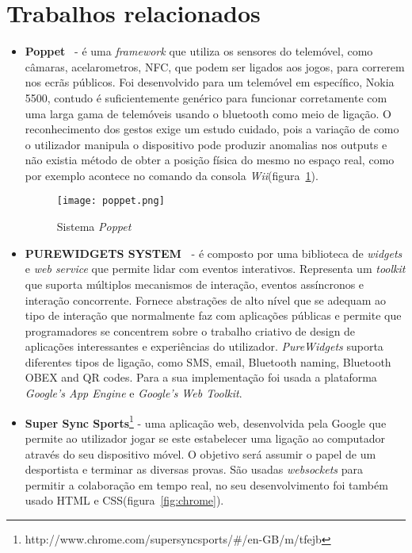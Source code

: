 \section{Trabalhos relacionados}
\begin{itemize}
\item \textbf{Poppet}~\cite{Vajk2008b} - é uma \textit{framework} que utiliza os sensores do telemóvel, como câmaras, acelarometros, NFC, que podem ser ligados aos jogos, para correrem nos ecrãs públicos. Foi desenvolvido para um telemóvel em específico, Nokia 5500, contudo é suficientemente genérico para funcionar corretamente com uma larga gama de telemóveis usando o bluetooth como meio de ligação. O reconhecimento dos gestos exige um estudo cuidado, pois a variação de como o utilizador manipula o dispositivo pode produzir anomalias nos outputs e não existia método de obter a posição física do mesmo no espaço real, como por exemplo acontece no comando da consola \textit{Wii}(figura~\ref{fig:poppet}).

\begin{figure}[h]
\centering
\texttt{[image: poppet.png]}
\caption[Sistema \textit{Poppet}] {Sistema \textit{Poppet}~\cite{Vajk2008b}}
\label{fig:poppet}
\end{figure}

\item \textbf{PUREWIDGETS SYSTEM~\cite{Cardoso2012g}} - é composto por uma biblioteca de \textit{widgets} e \textit{web service} que permite lidar com eventos interativos. Representa um \textit{toolkit} que suporta múltiplos mecanismos de interação, eventos assíncronos e interação concorrente. Fornece abstrações de alto nível que se adequam ao tipo de interação que normalmente faz com aplicações públicas e permite que programadores se concentrem sobre o trabalho criativo de design de aplicações interessantes e experiências do utilizador. \textit{PureWidgets} suporta diferentes tipos de ligação, como SMS, email, Bluetooth naming, Bluetooth OBEX and QR codes. Para a sua implementação foi usada a plataforma \textit{Google’s App Engine} e \textit{Google’s Web Toolkit}.


\item \textbf{Super Sync Sports}\footnote{http://www.chrome.com/supersyncsports/\#/en-GB/m/tfejb} -  uma aplicação web, desenvolvida pela Google que permite ao utilizador jogar se este estabelecer uma ligação ao computador através do seu dispositivo móvel. O objetivo será assumir o papel de um desportista e terminar as diversas provas. São usadas \textit{websockets} para permitir a colaboração em tempo real, no seu desenvolvimento foi também usado HTML e CSS(figura~\ref{fig:chrome}).


\end{itemize}
